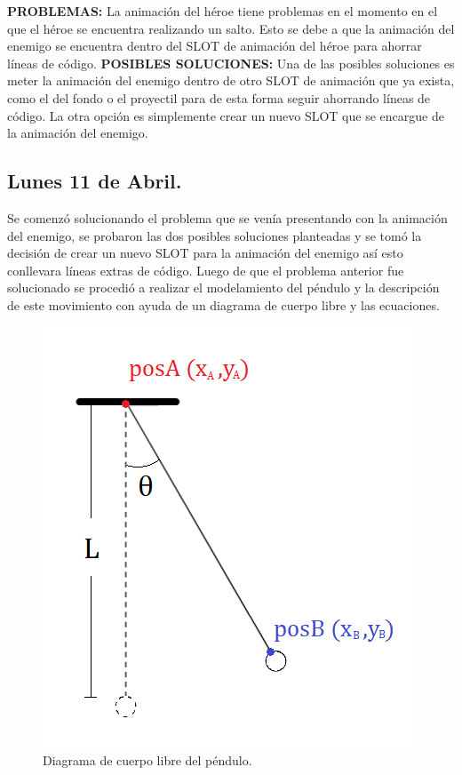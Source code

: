 \documentclass{article}
\begin{document}
\newpage
 \textbf{PROBLEMAS:} La animación del héroe tiene problemas en el momento en el que el héroe se encuentra realizando un salto. Esto se debe a que la animación del enemigo se encuentra dentro del SLOT de animación del héroe para ahorrar líneas de código.
 \newline
 \textbf{POSIBLES SOLUCIONES: }Una de las posibles soluciones es meter la animación del enemigo dentro de otro SLOT de animación que ya exista, como el del fondo o el proyectil para de esta forma seguir ahorrando líneas de código. La otra opción es simplemente crear un nuevo SLOT que se encargue de la animación del enemigo.
 \newline
 
\subsection{Lunes 11 de Abril.}
Se comenzó solucionando el problema que se venía presentando con la animación del enemigo, se probaron las dos posibles soluciones planteadas y se tomó la decisión de crear un nuevo SLOT para la animación del enemigo así esto conllevara líneas extras de código. Luego de que el problema anterior fue solucionado se procedió a realizar el modelamiento del péndulo y la descripción de este movimiento con ayuda de un diagrama de cuerpo libre y las ecuaciones. 

\newpage
\begin{figure}[h]
\includegraphics[scale=0.6]{Images/diagramapendulo.png}
\centering
\caption{Diagrama de cuerpo libre del péndulo.}
\label{fig:diagramacuerpolibre}
\end{figure}
\end{document}
